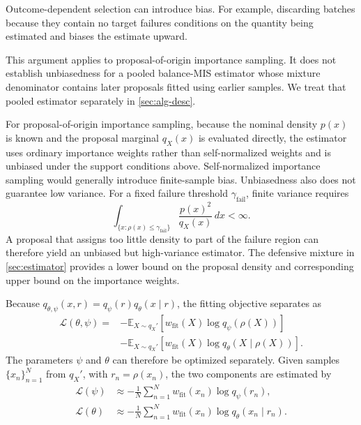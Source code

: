 \documentclass[twoside,11pt]{article}
\begin{document}
Outcome-dependent selection can introduce bias. For example, discarding batches because they contain no target failures conditions on the quantity being estimated and biases the estimate upward.

This argument applies to proposal-of-origin importance sampling. It does not establish unbiasedness for a pooled balance-MIS estimator whose mixture denominator contains later proposals fitted using earlier samples. We treat that pooled estimator separately in \cref{sec:alg-desc}.

For proposal-of-origin importance sampling, because the nominal density $p(x)$ is known and the proposal marginal $q_X(x)$ is evaluated directly, the estimator uses ordinary importance weights rather than self-normalized weights and is unbiased under the support conditions above. Self-normalized importance sampling would generally introduce finite-sample bias. Unbiasedness also does not guarantee low variance. For a fixed failure threshold $\gamma_{\mathrm{fail}}$, finite variance requires
\[
    \int_{\{x:\rho(x)\leq\gamma_{\mathrm{fail}}\}}
    \frac{p(x)^2}{q_X(x)}\,dx
    <
    \infty.
\]
A proposal that assigns too little density to part of the failure region can therefore yield an unbiased but high-variance estimator. The defensive mixture in \cref{sec:estimator} provides a lower bound on the proposal density and corresponding upper bound on the importance weights.

Because $q_{\theta,\psi}(x,r)=q_\psi(r)q_\theta(x\mid r)$, the fitting objective separates as
\begin{align}
    \mathcal{L}(\theta,\psi)
    ={}&
    -
    \mathbb{E}_{X\sim q_X'}
    \left[
        w_{\mathrm{fit}}(X)
        \log q_\psi(\rho(X))
    \right]
    \nonumber\\
    &-
    \mathbb{E}_{X\sim q_X'}
    \left[
        w_{\mathrm{fit}}(X)
        \log q_\theta(X\mid\rho(X))
    \right].
    \label{eq:factorized-fit}
\end{align}
The parameters $\psi$ and $\theta$ can therefore be optimized separately. Given samples $\{x_n\}_{n=1}^N$ from $q_X'$, with $r_n=\rho(x_n)$, the two components are estimated by
\begin{align}
    \mathcal{L}(\psi)
    &\approx
    -\frac{1}{N}
    \sum_{n=1}^N
    w_{\mathrm{fit}}(x_n)
    \log q_\psi(r_n),
    \\
    \mathcal{L}(\theta)
    &\approx
    -\frac{1}{N}
    \sum_{n=1}^N
    w_{\mathrm{fit}}(x_n)
    \log q_\theta(x_n\mid r_n).
    \label{eq:is-loss}
\end{align}
\end{document}
